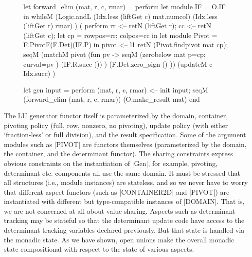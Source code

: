\documentclass[draft]{elsart}
\begin{document}
\begin{figure}
\begin{code2}
   let forward_elim (mat, r, c, rmar) = perform
        let module IF = O.IF in
          whileM (Logic.andL (Idx.less (liftGet c) mat.numcol)
                              (Idx.less (liftGet r) rmar) )
             ( perform
             rr <-- retN (liftGet r);
             cc <-- retN (liftGet c);
             let cp  = {rowpos=rr; colpos=cc} in
             let module Pivot = F.PivotF(F.Det)(IF.P) in
             pivot <-- l1 retN (Pivot.findpivot mat cp);
             seqM (matchM pivot (fun pv -> 
                      seqM (zerobelow mat {p=cp; curval=pv} )
                           (IF.R.succ ()) )
                      (F.Det.zero_sign () ))
                  (updateM c Idx.succ) )

   let gen input = perform
          (mat, r, c, rmar) <-- init input;
          seqM 
            (forward_elim (mat, r, c, rmar))
            (O.make_result mat)
end
\end{code2}
\end{figure}

The LU generator functor itself is 
parameterized by the domain, container, pivoting policy (full, row,
nonzero, no pivoting), update policy (with either `fraction-less'
or full division), and the result specification. Some of the
argument modules such as |PIVOT| are functors themselves (parameterized
by the domain, the container, and the determinant functor). The sharing
constraints express obvious constraints on the instantiation of |Gen|,
for example, pivoting, determinant etc. components all use the same
domain. It must be stressed that all structures (i.e., module
instances) are stateless, and so we never have to worry that different
aspect functors (such as |CONTAINER2D| and |PIVOT|) are instantiated
with different but type-compatible instances of |DOMAIN|. That is, we
are not concerned at all about value sharing. Aspects such as
determinant tracking may be stateful so that the determinant update
code have access to the determinant tracking variables declared
previously. But that state is handled via the monadic state. As we
have shown, open unions make the overall monadic state compositional
with respect to the state of various aspects.
\end{document}
